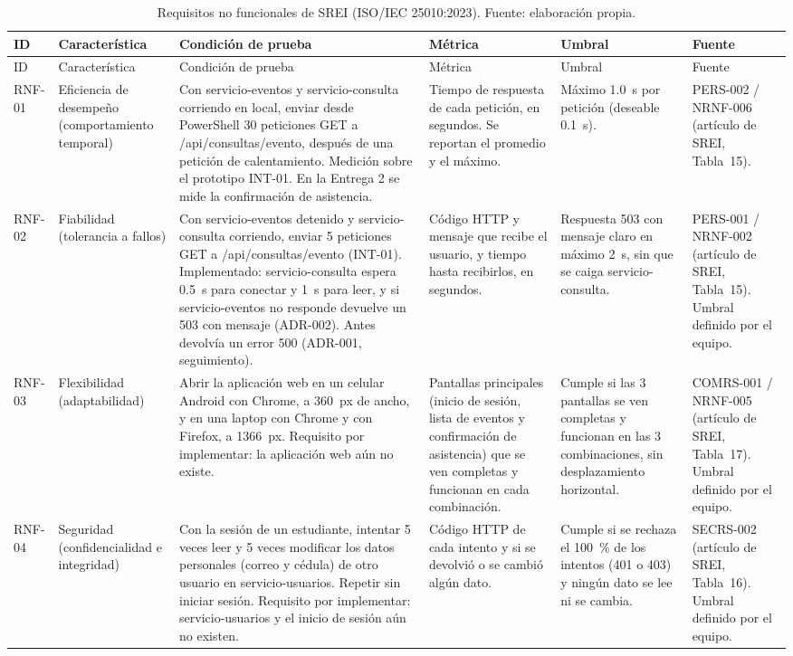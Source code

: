 {\small
\setlength{\tabcolsep}{4pt}
\begin{longtable}{p{1.4cm} p{2.5cm} p{3.3cm} p{2.5cm} p{2.3cm} p{2.3cm}}
\caption{Requisitos no funcionales de SREI (ISO/IEC 25010:2023). Fuente: elaboración propia.}\label{tab:rnf}\\
\toprule
ID & Característica & Condición de prueba & Métrica & Umbral & Fuente \\
\midrule
\endfirsthead
\toprule
ID & Característica & Condición de prueba & Métrica & Umbral & Fuente \\
\midrule
\endhead
\bottomrule
\endfoot
RNF-01 & Eficiencia de desempeño (comportamiento temporal) & Con servicio-eventos y servicio-consulta corriendo en local, enviar desde PowerShell 30 peticiones GET a /api\slash consultas\slash evento, después de una petición de calentamiento. Medición sobre el prototipo \mbox{INT-01}. En la Entrega 2 se mide la confirmación de asistencia. & Tiempo de respuesta de cada petición, en segundos. Se reportan el promedio y el máximo. & Máximo 1.0~s por petición (deseable 0.1~s). & PERS-002 / NRNF-006 (artículo de SREI, Tabla~15). \\
RNF-02 & Fiabilidad (tolerancia a fallos) & Con servicio-eventos detenido y servicio-consulta corriendo, enviar 5 peticiones GET a /api\slash consultas\slash evento (\mbox{INT-01}). Implementado: servicio-consulta espera 0.5~s para conectar y 1~s para leer, y si servicio-eventos no responde devuelve un 503 con mensaje (\mbox{ADR-002}). Antes devolvía un error 500 (\mbox{ADR-001}, seguimiento). & Código HTTP y mensaje que recibe el usuario, y tiempo hasta recibirlos, en segundos. & Respuesta 503 con mensaje claro en máximo 2~s, sin que se caiga servicio-consulta. & PERS-001 / NRNF-002 (artículo de SREI, Tabla~15). Umbral definido por el equipo. \\
RNF-03 & Flexibilidad (adaptabilidad) & Abrir la aplicación web en un celular Android con Chrome, a 360~px de ancho, y en una laptop con Chrome y con Firefox, a 1366~px. Requisito por implementar: la aplicación web aún no existe. & Pantallas principales (inicio de sesión, lista de eventos y confirmación de asistencia) que se ven completas y funcionan en cada combinación. & Cumple si las 3 pantallas se ven completas y funcionan en las 3 combinaciones, sin desplazamiento horizontal. & COMRS-001 / NRNF-005 (artículo de SREI, Tabla~17). Umbral definido por el equipo. \\
RNF-04 & Seguridad (confidencialidad e integridad) & Con la sesión de un estudiante, intentar 5 veces leer y 5 veces modificar los datos personales (correo y cédula) de otro usuario en servicio-usuarios. Repetir sin iniciar sesión. Requisito por implementar: servicio-usuarios y el inicio de sesión aún no existen. & Código HTTP de cada intento y si se devolvió o se cambió algún dato. & Cumple si se rechaza el 100~\% de los intentos (401 o 403) y ningún dato se lee ni se cambia. & SECRS-002 (artículo de SREI, Tabla~16). Umbral definido por el equipo. \\

\end{longtable}}
